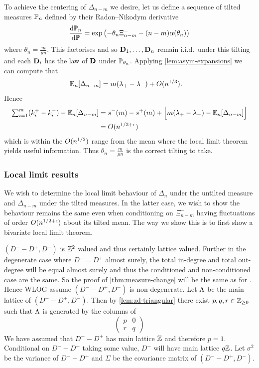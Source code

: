 To achieve the centering of $\Delta_{n-m}$ we desire, let us define a sequence of tilted measures $\P_n$ defined by their Radon--Nikodym derivative
\begin{equation}
    \diff{\P_n}{\P} = \exp \left( - \theta_n \Xi^-_{n-m} - (n - m) \alpha(\theta_n) \right)
\end{equation}
where $\theta_n = \frac{m}{\mu n}$. This factorises and so $\vD_1, \ldots, \vD_n$ remain i.i.d.\ under this tilting and each $\vD_i$ has the law of $\vD$ under $\P_{\theta_n}$. Applying \cref{lem:asym-expansions} we can compute that
\begin{align*}
    \E_n[\Delta_{n-m}] 
    &= m(\lambda_+ - \lambda_-) + \bigo(n^{1/3}).
\end{align*}
Hence
\begin{align*}
    \textstyle \sum_{i=1}^m (k_i^+ - k_i^-) - \E_n[\Delta_{n-m}] 
    &= s^-(m) - s^+(m) + \Big[ m(\lambda_+ - \lambda_-) - \E_n[\Delta_{n-m}] \Big] \\
    &= \bigo(n^{1/3 + \epsilon})
\end{align*}
which is within the $\bigo(n^{1/2})$ range from the mean where the local limit theorem yields useful information. Thus $\theta_n = \frac{m}{\mu n}$ is the correct tilting to take. 

\subsubsection{Local limit results}

We wish to determine the local limit behaviour of $\Delta_n$ under the untilted measure and $\Delta_{n-m}$ under the tilted measures. In the latter case, we wish to show the behaviour remains the same even when conditioning on $\Xi_{n-m}^-$ having fluctuations of order $\bigo(n^{1/2 + \epsilon})$ about its tilted mean. The way we show this is to first show a bivariate local limit theorem.

$(D^- - D^+, D^-)$ is $\Z^2$ valued and thus certainly lattice valued. Further in the degenerate case where $D^- = D^+$ almost surely, the total in-degree and total out-degree will be equal almost surely and thus the conditioned and non-conditioned case are the same. So the proof of \cref{thm:measure-change} will be the same as for \cite[Proposition 4.3]{conchon--kerjanStableGraphMetric2020}. Hence WLOG assume $(D^- - D^+, D^-)$ is non-degenerate. Let $\lattice$ be the main lattice of $(D^- - D^+, D^-)$. Then by \cref{lem:zd-triangular} there exist $p, q, r \in \Z_{\geq 0}$ such that $\lattice$ is generated by the columns of
\begin{equation*}
    \begin{pmatrix}
        p & 0 \\
        r & q
    \end{pmatrix}
\end{equation*}
We have assumed that $D^- - D^+$ has main lattice $\Z$ and therefore $p = 1$. Conditional on $D^- - D^+$ taking some value, $D^-$ will have main lattice $q \Z$. Let $\sigma^2$ be the variance of $D^- - D^+$ and $\Sigma$ be the covariance matrix of $(D^- - D^+, D^-)$.


